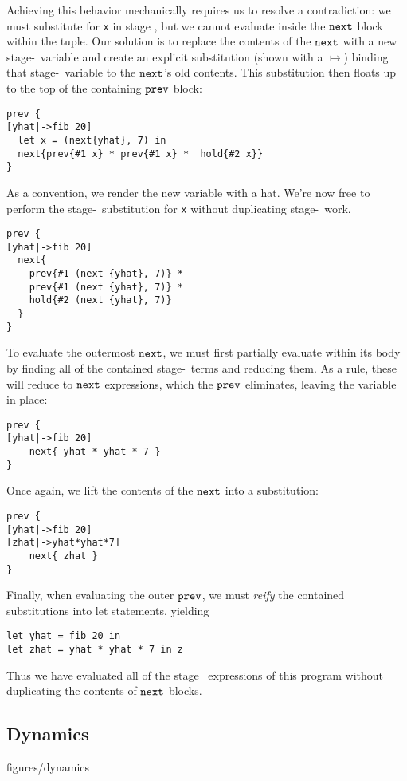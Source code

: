 Achieving this behavior mechanically requires us to resolve a contradiction:
we must substitute for \texttt{x} in stage \bbone, but we cannot evaluate inside the ${\tt next}$ block within the tuple. 
Our solution is to replace the contents of the ${\tt next}$ with a new stage-\bbtwo\ variable and create an explicit substitution (shown with a $\mapsto$) binding that stage-\bbtwo\ variable to the ${\tt next}$'s old contents.  
This substitution then floats up to the top of the containing ${\tt prev}$ block:
\begin{lstlisting} 
prev {
[yhat|->fib 20]
  let x = (next{yhat}, 7) in
  next{prev{#1 x} * prev{#1 x} *  hold{#2 x}}
}
\end{lstlisting}
As a convention, we render the new variable with a %
hat.  We're now free to perform the stage-\bbone~substitution for {\tt x} without duplicating stage-\bbtwo\ work.
\begin{lstlisting} 
prev {
[yhat|->fib 20]
  next{
    prev{#1 (next {yhat}, 7)} * 
    prev{#1 (next {yhat}, 7)} *
    hold{#2 (next {yhat}, 7)}
  }
}
\end{lstlisting}
To evaluate the outermost ${\tt next}$, we must first partially evaluate within its body by finding all of the contained stage-\bbone~terms and reducing them. 
As a rule, these will reduce to ${\tt next}$ expressions, which the ${\tt prev}$ eliminates, leaving the variable in place:
\begin{lstlisting} 
prev {
[yhat|->fib 20]
    next{ yhat * yhat * 7 }
}
\end{lstlisting}
Once again, we lift the contents of the ${\tt next}$ into a substitution:
\begin{lstlisting} 
prev {
[yhat|->fib 20]
[zhat|->yhat*yhat*7]
    next{ zhat }
}
\end{lstlisting}
Finally, when evaluating the outer ${\tt prev}$, we must {\em reify} the contained substitutions into let statements, yielding
\begin{lstlisting} 
let yhat = fib 20 in
let zhat = yhat * yhat * 7 in z
\end{lstlisting}

Thus we have evaluated all of the stage \bbone\ expressions of this program without duplicating the contents of ${\tt next}$ blocks.

\subsection{Dynamics}
\label{ssec:dynamics}

 {figures/dynamics}

